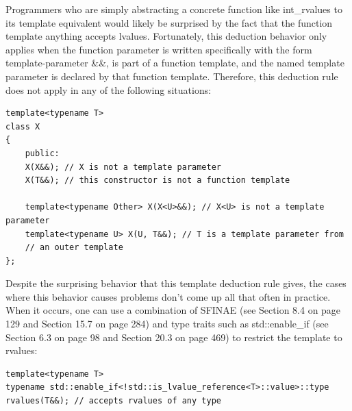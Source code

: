 Programmers who are simply abstracting a concrete function like int\_rvalues to its template equivalent would likely be surprised by the fact that the function template anything accepts lvalues. Fortunately, this deduction behavior only applies when the function parameter is written specifically with the form template-parameter \&\&, is part of a function template, and the named template parameter is declared by that function template. Therefore, this deduction rule does not apply in any of the following situations:

\begin{lstlisting}[style=styleCXX]
template<typename T>
class X
{
	public:
	X(X&&); // X is not a template parameter
	X(T&&); // this constructor is not a function template
	
	template<typename Other> X(X<U>&&); // X<U> is not a template parameter
	template<typename U> X(U, T&&); // T is a template parameter from
	// an outer template
};
\end{lstlisting}

Despite the surprising behavior that this template deduction rule gives, the cases where this behavior causes problems don’t come up all that often in practice. When it occurs, one can use a combination of SFINAE (see Section 8.4 on page 129 and Section 15.7 on page 284) and type traits such as std::enable\_if (see Section 6.3 on page 98 and Section 20.3 on page 469) to restrict the template to rvalues:

\begin{lstlisting}[style=styleCXX]
template<typename T>
typename std::enable_if<!std::is_lvalue_reference<T>::value>::type
rvalues(T&&); // accepts rvalues of any type
\end{lstlisting}


























